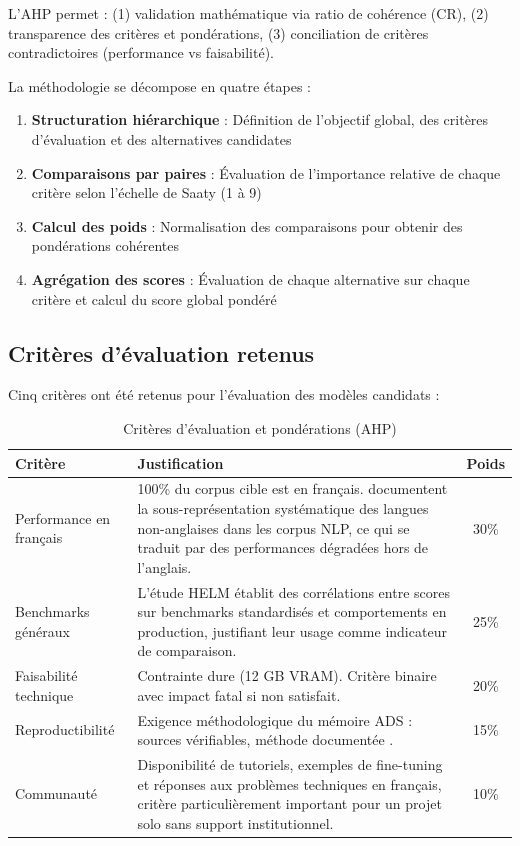 L'AHP permet : (1) validation mathématique via ratio de cohérence (CR), (2) transparence des critères et pondérations, (3) conciliation de critères contradictoires (performance vs faisabilité).

La méthodologie se décompose en quatre étapes :

\begin{enumerate}
    \item \textbf{Structuration hiérarchique} : Définition de l'objectif global, des critères d'évaluation et des alternatives candidates
    
    \item \textbf{Comparaisons par paires} : Évaluation de l'importance relative de chaque critère selon l'échelle de Saaty (1 à 9)
    
    \item \textbf{Calcul des poids} : Normalisation des comparaisons pour obtenir des pondérations cohérentes
    
    \item \textbf{Agrégation des scores} : Évaluation de chaque alternative sur chaque critère et calcul du score global pondéré
\end{enumerate}

\subsection{Critères d'évaluation retenus}

Cinq critères ont été retenus pour l'évaluation des modèles candidats :

\begin{table}[H]
\centering
\caption{Critères d'évaluation et pondérations (AHP)}
\label{tab:criteres_ahp}
\begin{tabular}{@{}lp{8cm}c@{}}
\toprule
\textbf{Critère} & \textbf{Justification} & \textbf{Poids} \\ \midrule
Performance en français & 100\% du corpus cible est en français. \citet{joshi2020linguistic} documentent la sous-représentation systématique des langues non-anglaises dans les corpus NLP, ce qui se traduit par des performances dégradées hors de l'anglais. & 30\% \\
\addlinespace
Benchmarks généraux & L'étude HELM \citep{liang2022holistic} établit des corrélations entre scores sur benchmarks standardisés et comportements en production, justifiant leur usage comme indicateur de comparaison. & 25\% \\
\addlinespace
Faisabilité technique & Contrainte dure (12 GB VRAM). Critère binaire avec impact fatal si non satisfait. & 20\% \\
\addlinespace
Reproductibilité & Exigence méthodologique du mémoire ADS : sources vérifiables, méthode documentée \citep{goodman2016reproducibility}. & 15\% \\
\addlinespace
Communauté & Disponibilité de tutoriels, exemples de fine-tuning et réponses aux problèmes techniques en français, critère particulièrement important pour un projet solo sans support institutionnel. & 10\% \\ \bottomrule
\end{tabular}
\end{table}

